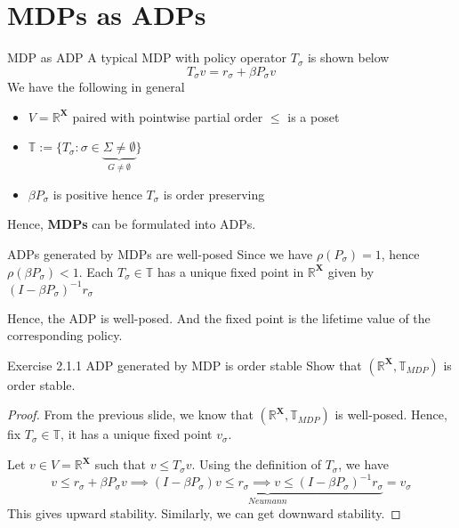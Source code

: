 \section{MDPs as ADPs}

\begin{frame}{MDP as ADP}
A typical MDP with policy operator $T_\sigma$ is shown below
$$
T_\sigma v  = r_\sigma +\beta P_\sigma v
$$
We have the following in general
\begin{itemize}
    \item $V = \mathbb{R}^{\mathbf{X}}$ paired with pointwise partial order $\le$ is a poset
    \item $\mathbb{T}:=\{T_\sigma :\sigma\in\underbrace{\Sigma\neq \emptyset}_{G\neq \emptyset}\}$
    \item $\beta P_\sigma$ is positive hence $T_\sigma$ is order preserving
\end{itemize}
Hence, \textbf{MDPs} can be formulated into ADPs.
\end{frame}

\begin{frame}{ADPs generated by MDPs are well-posed}
Since we have $\rho(P_\sigma)=1$, hence $\rho(\beta P_\sigma)<1$. Each $T_\sigma\in\mathbb{T}$ has a unique fixed point in $\mathbb{R}^{\mathbf{X}}$ given by $(I-\beta P_\sigma)^{-1}r_\sigma$

Hence, the ADP is well-posed. And the fixed point is the lifetime value of the corresponding policy. 
    
\end{frame}

\begin{frame}{Exercise 2.1.1 ADP generated by MDP is order stable }
Show that $(\mathbb{R}^{\mathbf{X}},\mathbb{T}_{MDP})$ is order stable. 
\begin{proof}
    From the previous slide, we know that $(\mathbb{R}^{\mathbf{X}},\mathbb{T}_{MDP})$ is well-posed. Hence, fix $T_\sigma\in\mathbb{T}$, it has a unique fixed point $v_\sigma$. 
    
    Let $v\in V=\mathbb{R}^{\mathbf{X}}$ such that $v\le T_\sigma v$. Using the definition of $T_\sigma$, we have
    $$
    v\le r_\sigma + \beta P_\sigma v \implies  \underbrace{(I-\beta P_\sigma)v\le r_\sigma\implies v\le (I-\beta P_\sigma)^{-1}r_\sigma}_{Neumann } =v_\sigma
    $$
    This gives upward stability. Similarly, we can get downward stability.
\end{proof}
\end{frame}

